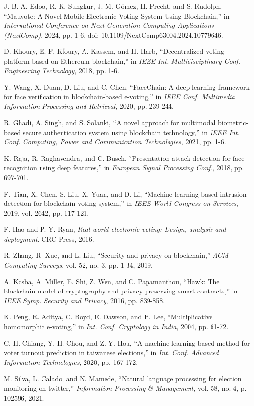 \documentclass[conference]{IEEEtran}
\begin{document}
\begin{thebibliography}{20}
J. B. A. Edoo, R. K. Sungkur, J. M. Gómez, H. Precht, and S. Rudolph, ``Mauvote: A Novel Mobile Electronic Voting System Using Blockchain,'' in {\it International Conference on Next Generation Computing Applications (NextComp)}, 2024, pp. 1-6, doi: 10.1109/NextComp63004.2024.10779646.

D. Khoury, E. F. Kfoury, A. Kassem, and H. Harb, ``Decentralized voting platform based on Ethereum blockchain,'' in {\it IEEE Int. Multidisciplinary Conf. Engineering Technology}, 2018, pp. 1-6.

Y. Wang, X. Duan, D. Liu, and C. Chen, ``FaceChain: A deep learning framework for face verification in blockchain-based e-voting,'' in {\it IEEE Conf. Multimedia Information Processing and Retrieval}, 2020, pp. 239-244.

R. Ghadi, A. Singh, and S. Solanki, ``A novel approach for multimodal biometric-based secure authentication system using blockchain technology,'' in {\it IEEE Int. Conf. Computing, Power and Communication Technologies}, 2021, pp. 1-6.

K. Raja, R. Raghavendra, and C. Busch, ``Presentation attack detection for face recognition using deep features,'' in {\it European Signal Processing Conf.}, 2018, pp. 697-701.

F. Tian, X. Chen, S. Liu, X. Yuan, and D. Li, ``Machine learning-based intrusion detection for blockchain voting system,'' in {\it IEEE World Congress on Services}, 2019, vol. 2642, pp. 117-121.

F. Hao and P. Y. Ryan, {\it Real-world electronic voting: Design, analysis and deployment}. CRC Press, 2016.

R. Zhang, R. Xue, and L. Liu, ``Security and privacy on blockchain,'' {\it ACM Computing Surveys}, vol. 52, no. 3, pp. 1-34, 2019.

A. Kosba, A. Miller, E. Shi, Z. Wen, and C. Papamanthou, ``Hawk: The blockchain model of cryptography and privacy-preserving smart contracts,'' in {\it IEEE Symp. Security and Privacy}, 2016, pp. 839-858.

K. Peng, R. Aditya, C. Boyd, E. Dawson, and B. Lee, ``Multiplicative homomorphic e-voting,'' in {\it Int. Conf. Cryptology in India}, 2004, pp. 61-72.

C. H. Chiang, Y. H. Chou, and Z. Y. Hou, ``A machine learning-based method for voter turnout prediction in taiwanese elections,'' in {\it Int. Conf. Advanced Information Technologies}, 2020, pp. 167-172.

M. Silva, L. Calado, and N. Mamede, ``Natural language processing for election monitoring on twitter,'' {\it Information Processing \& Management}, vol. 58, no. 4, p. 102596, 2021.
\end{thebibliography}
\end{document}
